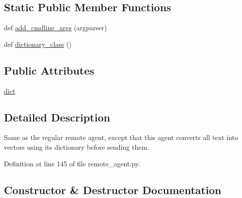 \subsection*{Static Public Member Functions}
\begin{DoxyCompactItemize}
\item 
def \hyperlink{classparlai_1_1agents_1_1remote__agent_1_1remote__agent_1_1ParsedRemoteAgent_ae364a1860ec6ff9f32dabc42b96004d0}{add\+\_\+cmdline\+\_\+args} (argparser)
\item 
def \hyperlink{classparlai_1_1agents_1_1remote__agent_1_1remote__agent_1_1ParsedRemoteAgent_a5759817c6b1d248a0b64861222745f62}{dictionary\+\_\+class} ()
\end{DoxyCompactItemize}
\subsection*{Public Attributes}
\begin{DoxyCompactItemize}
\item 
\hyperlink{classparlai_1_1agents_1_1remote__agent_1_1remote__agent_1_1ParsedRemoteAgent_ac38a24353bb2fd988c9330c5c9e1434f}{dict}
\end{DoxyCompactItemize}


\subsection{Detailed Description}
\begin{DoxyVerb}Same as the regular remote agent, except that this agent converts all
text into vectors using its dictionary before sending them.
\end{DoxyVerb}
 

Definition at line 145 of file remote\+\_\+agent.\+py.



\subsection{Constructor \& Destructor Documentation}
\mbox{\label{classparlai_1_1agents_1_1remote__agent_1_1remote__agent_1_1ParsedRemoteAgent_a0bb2c02bb6c928455c2ee24117797e19}} 
